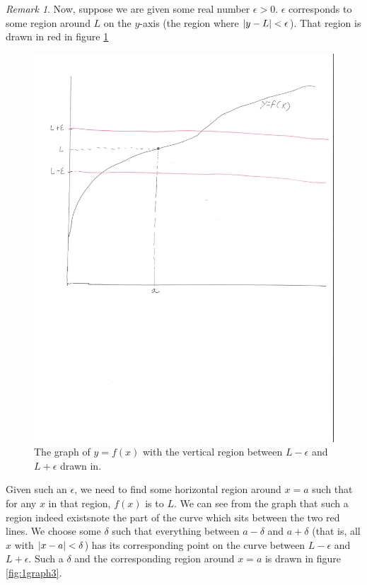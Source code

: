 \documentclass[english]{book}
\DeclarePairedDelimiter\abs{\lvert}{\rvert}%
\theoremstyle{remark}
\newtheorem{remark}{Remark}[theorem]
\theoremstyle{definition}
\newtheorem*{next week}{Next Week}
\begin{document}
\begin{remark}
Now, suppose we are given some real number $\epsilon>0$. $\epsilon$ corresponds to some region around $L$ on the $y$-axis (the region where $\abs{y-L}<\epsilon$). That region is drawn in red in figure \ref{fig:1graph2}

\begin{figure}[h!]\centering
	\includegraphics[scale=0.5,trim={0 4in 10mm 0},clip]{1graph2} \caption{The graph of $y=f(x)$ with the vertical region between $L-\epsilon$ and $L+\epsilon$ drawn in.\label{fig:1graph2}}
\end{figure}

\newpage Given such an $\epsilon$, we need to find some horizontal region around $x=a$ such that for any $x$ in that region, $f(x)$ is  to $L$. We can see from the graph that such a region indeed exists\textemdash note the part of the curve which sits between the two red lines. We choose some $\delta$ such that everything between $a-\delta$ and $a+\delta$ (that is, all $x$ with $\abs{x-a}<\delta$) has its corresponding point on the curve between $L-\epsilon$ and $L+\epsilon$. Such a $\delta$ and the corresponding region around $x=a$ is drawn in figure \ref{fig:1graph3}.


\end{remark}
\end{document}

